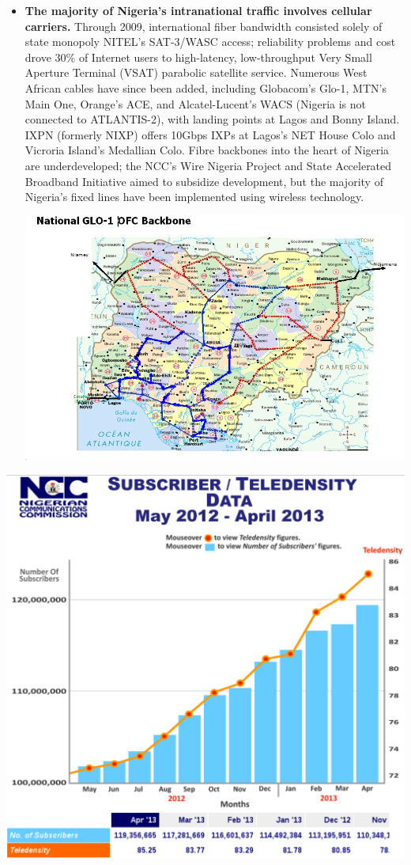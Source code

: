 \documentclass[]{sigplanconf}
\begin{document}
\begin{itemize}
\item \textbf{The majority of Nigeria's intranational traffic involves
	cellular carriers.} Through 2009, international fiber bandwidth consisted solely of state monopoly
	NITEL's SAT-3/WASC access\cite{backbone}; reliability problems and cost drove 30\%
	of Internet users to high-latency, low-throughput
	Very Small Aperture Terminal (VSAT) parabolic satellite service.
	Numerous West African cables have since been added, including
	Globacom's Glo-1, MTN's Main One, Orange's ACE, and Alcatel-Lucent's WACS
	(Nigeria is not connected to ATLANTIS-2), with landing points at
	Lagos and Bonny Island. IXPN (formerly NIXP) offers 10Gbps IXPs at
	Lagos's NET House Colo and Vicroria Island's Medallian Colo\cite{ixpn}.
	Fibre backbones into the heart of Nigeria are underdeveloped; the NCC's
	Wire Nigeria Project and State Accelerated Broadband Initiative\cite{nccwire}
	aimed to subsidize development, but the majority of Nigeria's fixed
	lines have been implemented using wireless technology\cite{fixedline}.

\includegraphics[width=\linewidth]{glo-1.jpg}
\end{itemize}

\includegraphics[width=\linewidth]{ncc.pdf}
\\
\end{document}
